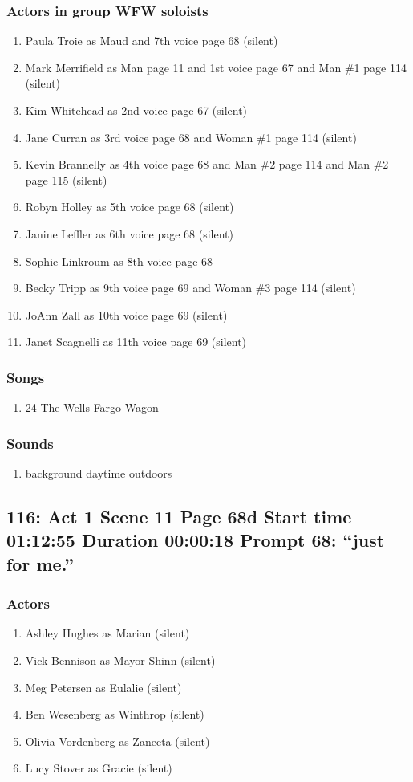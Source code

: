 \subsubsection{Actors in group WFW soloists}
\begin{enumerate}
\item Paula Troie as Maud and 7th voice page 68 (silent)
\item Mark Merrifield as Man page 11 and 1st voice page 67 and Man \#1 page 114 (silent)
\item Kim Whitehead as 2nd voice page 67 (silent)
\item Jane Curran as 3rd voice page 68 and Woman \#1 page 114 (silent)
\item Kevin Brannelly as 4th voice page 68 and Man \#2 page 114 and Man \#2 page 115 (silent)
\item Robyn Holley as 5th voice page 68 (silent)
\item Janine Leffler as 6th voice page 68 (silent)
\item Sophie Linkroum as 8th voice page 68
\item Becky Tripp as 9th voice page 69 and Woman \#3 page 114 (silent)
\item JoAnn Zall as 10th voice page 69 (silent)
\item Janet Scagnelli as 11th voice page 69 (silent)
\end{enumerate}

\subsubsection{Songs}
\begin{enumerate}
\item 24 The Wells Fargo Wagon
\end{enumerate}\subsubsection{Sounds}
\begin{enumerate}
\item background daytime outdoors
\end{enumerate}
\subsection{116: Act 1 Scene 11 Page 68d Start time 01:12:55 Duration 00:00:18 Prompt 68: ``just for me.''}

\subsubsection{Actors}
\begin{enumerate}
\item Ashley Hughes as Marian (silent)
\item Vick Bennison as Mayor Shinn (silent)
\item Meg Petersen as Eulalie (silent)
\item Ben Wesenberg as Winthrop (silent)
\item Olivia Vordenberg as Zaneeta (silent)
\item Lucy Stover as Gracie (silent)
\end{enumerate}
